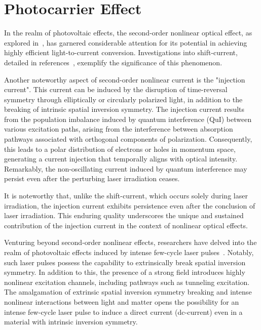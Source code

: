\section{Photocarrier Effect}
In the realm of photovoltaic effects, the second-order nonlinear optical effect, as explored in~\cite{PhysRevB.61.5337}, has garnered considerable attention for its potential in achieving highly efficient light-to-current conversion. Investigations into shift-current, detailed in references~\cite{PhysRevLett.107.126805,doi:10.1126/science.1168636,Yang2010,10.1063/5.0101513}, exemplify the significance of this phenomenon.

Another noteworthy aspect of second-order nonlinear current is the "injection current"\cite{sipe2000second,laman2005ultrafast, 10.1063/1.125084,PhysRevB.61.5337,10.1063/1.2131191}. This current can be induced by the disruption of time-reversal symmetry through elliptically or circularly polarized light, in addition to the breaking of intrinsic spatial inversion symmetry. The injection current results from the population imbalance induced by quantum interference (\gls{QuI}) between various excitation paths, arising from the interference between absorption pathways associated with orthogonal components of polarization. Consequently, this leads to a polar distribution of electrons or holes in momentum space, generating a current injection that temporally aligns with optical intensity. Remarkably, the non-oscillating current induced by quantum interference may persist even after the perturbing laser irradiation ceases.

It is noteworthy that, unlike the shift-current, which occurs solely during laser irradiation, the injection current exhibits persistence even after the conclusion of laser irradiation. This enduring quality underscores the unique and sustained contribution of the injection current in the context of nonlinear optical effects.

Venturing beyond second-order nonlinear effects, researchers have delved into the realm of photovoltaic effects induced by intense few-cycle laser pulses~\cite{Schiffrin2013,PhysRevLett.113.087401,PhysRevLett.116.057401,Higuchi2017,Heide_2020,Morimoto_2022}. Notably, such laser pulses possess the capability to extrinsically break spatial inversion symmetry. In addition to this, the presence of a strong field introduces highly nonlinear excitation channels, including pathways such as tunneling excitation. The amalgamation of extrinsic spatial inversion symmetry breaking and intense nonlinear interactions between light and matter opens the possibility for an intense few-cycle laser pulse to induce a direct current (dc-current) even in a material with intrinsic inversion symmetry.

